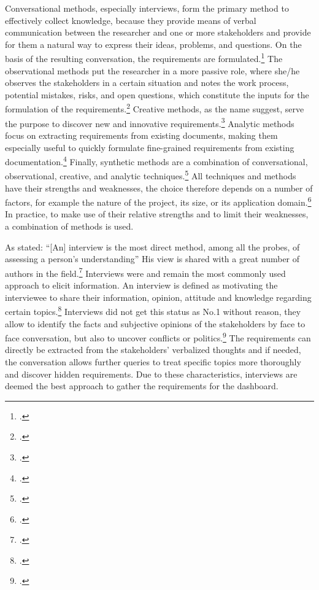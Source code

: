 Conversational methods, especially interviews, form the primary method to effectively collect knowledge, because they provide means of verbal communication between the researcher and one or more stakeholders and provide for them a natural way to express their ideas, problems, and questions. On the basis of the resulting conversation, the requirements are formulated.\footcite[Cf.][pp.226/227]{ZhangEffectiverequirementsdevelopmentA2007} The observational methods put the researcher in a more passive role, where she/he observes the stakeholders in a certain situation and notes the work process, potential mistakes, risks, and open questions, which constitute the inputs for the formulation of the requirements.\footcite[Cf.][chapter 3]{PohlRequirementsengineeringfundamentals2011} Creative methods, as the name suggest, serve the purpose to discover new and innovative requirements.\footcite[Cf.][chapter 3]{PohlRequirementsengineeringfundamentals2011} Analytic methods focus on extracting requirements from existing documents, making them especially useful to quickly formulate fine-grained requirements from existing documentation.\footcite[Cf.][p.228]{ZhangEffectiverequirementsdevelopmentA2007} Finally, synthetic methods are a combination of conversational, observational, creative, and analytic techniques.\footcite[Cf.][p.228]{ZhangEffectiverequirementsdevelopmentA2007} All techniques and methods have their strengths and weaknesses, the choice therefore depends on a number of factors, for example the nature of the project, its size, or its application domain.\footcite[Cf.][p.42]{ZowghiRequirementselicitationsurvey2005}
In practice, to make use of their relative strengths and to limit their weaknesses, a combination of methods is used. 


As \cite{WhiteProbingunderstanding1992} stated: \enquote{[An] interview is the most direct method, among all the probes, of assessing a person’s understanding} His view is shared with a great number of authors in the field.\footcites[Cf.][p.174]{MacaulayRequirementscapturecooperative1993}[cf.][p.105]{SommervilleSoftwareengineering2011}[cf.][p.25]{ZowghiRequirementselicitationsurvey2005}[cf.][p.172]{HickeyElicitationtechniqueselection2003}[cf.][p.227]{ZhangEffectiverequirementsdevelopmentA2007}[cf.][p.92]{MasonQualitativeresearching2002}
Interviews were and remain the most commonly used approach to elicit information. An interview is defined as motivating the interviewee to share their information, opinion, attitude and knowledge regarding certain topics.\footcite[Cf.][p.133]{KrugerqualitativeInhaltsanalyseMethode2004} Interviews did not get this status as No.1 without reason, they allow to identify the facts and subjective opinions of the stakeholders by face to face conversation, but also to uncover conflicts or politics.\footcite[Cf.][p.2]{TiwariMethodologySelectionRequirement2017} The requirements can directly be extracted from the stakeholders' verbalized thoughts and if needed, the conversation allows further queries to treat specific topics more thoroughly and discover hidden requirements. Due to these characteristics, interviews are deemed the best approach to gather the requirements for the dashboard.

